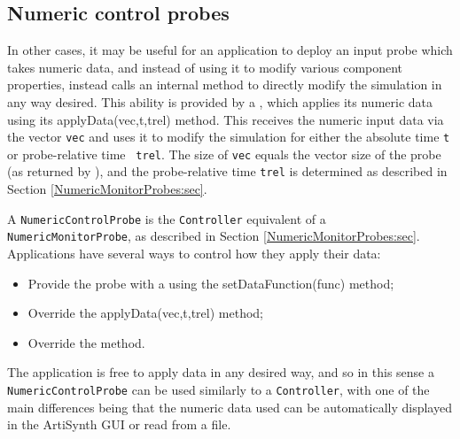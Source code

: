 \subsection{Numeric control probes}
\label{NumericControlProbes:sec}

In other cases, it may be useful for an application to deploy an input
probe which takes numeric data, and instead of using it to modify
various component properties, instead calls an internal method to
directly modify the simulation in any way desired.  This ability is
provided by a ,
which applies its numeric data using its %
{applyData(vec,t,trel)} method. This receives the numeric input data
via the vector {\tt vec} and uses it to modify the simulation for
either the absolute time {\tt t} or probe-relative time {\tt
trel}. The size of {\tt vec} equals the vector size of the probe (as
returned by
), and
the probe-relative time {\tt trel} is determined as described in
Section \ref{NumericMonitorProbes:sec}.

A {\tt NumericControlProbe} is the {\tt Controller} equivalent
of a {\tt NumericMonitorProbe}, as described in Section 
\ref{NumericMonitorProbes:sec}. Applications have several ways to control
how they apply their data:

\begin{itemize}

\item Provide the probe with a 
 using the
%
{setDataFunction(func)} method;

\item Override the %
{applyData(vec,t,trel)}
method;

\item Override the 
method.

\end{itemize}

The application is free to apply data in any desired way, and so in
this sense a {\tt NumericControlProbe} can be used similarly to a
{\tt Controller}, with one of the main differences being that the
numeric data used can be automatically displayed in the ArtiSynth GUI
or read from a file.

